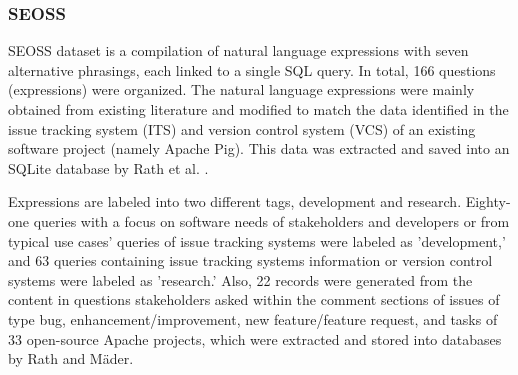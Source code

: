 \subsubsection{SEOSS}

\ac{SEOSS} dataset is a compilation of natural language expressions with seven alternative phrasings, each linked to a single SQL query. In total, 166 questions (expressions) were organized. The natural language expressions were mainly obtained from existing literature and modified to match the data identified in the issue tracking system (ITS) and version control system (VCS) of an existing software project (namely Apache Pig). This data was extracted and saved into an SQLite database by Rath et al. \cite{RATH2019104005}.

Expressions are labeled into two different tags, development and research. Eighty-one queries with a focus on software needs of stakeholders and developers or from typical use cases' queries of issue tracking systems were labeled as 'development,' and 63 queries containing issue tracking systems information or version control systems were labeled as 'research.' Also, 22 records were generated from the content in questions stakeholders asked within the comment sections of issues of type bug, enhancement/improvement, new feature/feature request, and tasks of 33 open-source Apache projects, which were extracted and stored into databases by Rath and Mäder\cite{RATH2019104005}.



